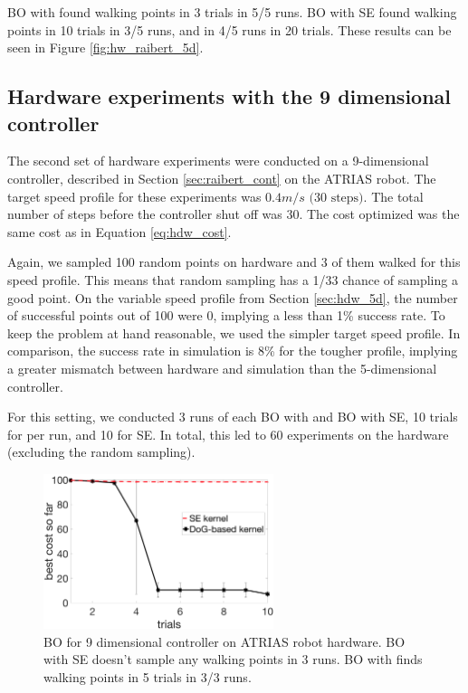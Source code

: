 BO with \dogkernel found walking points in 3 trials in 5/5 runs. BO with SE found walking points in 10 trials in 3/5 runs, and in 4/5 runs in 20 trials. These results can be seen in Figure \ref{fig:hw_raibert_5d}.


\subsection{Hardware experiments with the 9 dimensional controller}
\label{subsec:dog_9d}
The second set of hardware experiments were conducted on a 9-dimensional controller, described in Section \ref{sec:raibert_cont} on the ATRIAS robot. The target speed profile for these experiments was $0.4 m/s \text{ (30 steps)}$. The total number of steps before the controller shut off was $30$. The cost optimized was the same cost as in Equation \ref{eq:hdw_cost}. 

Again, we sampled 100 random points on hardware and 3 of them walked for this speed profile. This means that random sampling has a 1/33 chance of sampling a good point. On the variable speed profile from Section \ref{sec:hdw_5d}, the number of successful points out of 100 were 0, implying a less than 1\% success rate. To keep the problem at hand reasonable, we used the simpler target speed profile. In comparison, the success rate in simulation is 8\% for the tougher profile, implying a greater mismatch between hardware and simulation than the 5-dimensional controller. 

For this setting, we conducted 3 runs of each BO with \dogkernel and BO with SE, 10 trials for \dogkernel per run, and 10 for SE. In total, this led to 60 experiments on the hardware (excluding the random sampling). 

\begin{figure}[t]
\centering
\includegraphics[width=0.6\textwidth]{img/hw_raibert_9d.png}
\caption{\small{BO for 9 dimensional controller on ATRIAS robot hardware. BO with SE doesn't sample any walking points in 3 runs. BO with \dogkernel finds walking points in 5 trials in 3/3 runs.}}
\label{fig:hw_raibert_9d}
\end{figure}

